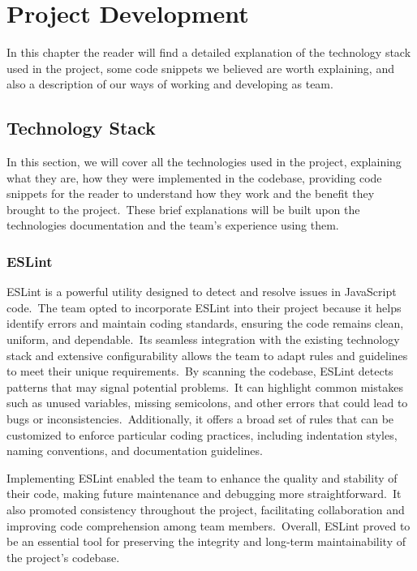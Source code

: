 \chapter{Project Development}\label{ch:project-development}

In this chapter the reader will find a detailed explanation of the technology stack used in the project, some code snippets we believed are worth explaining, and also a description of our ways of working and developing as team.

\section{Technology Stack}\label{sec:tecnology-stack}

In this section, we will cover all the technologies used in the project, explaining what they are, how they were implemented in the codebase, providing code snippets for the reader to understand how they work and the benefit they brought to the project.\ These brief explanations will be built upon the technologies documentation and the team's experience using them.

\subsection{ESLint}\label{subsec:eslint}

ESLint is a powerful utility designed to detect and resolve issues in JavaScript code.\ The team opted to incorporate ESLint into their project because it helps identify errors and maintain coding standards, ensuring the code remains clean, uniform, and dependable.\ Its seamless integration with the existing technology stack and extensive configurability allows the team to adapt rules and guidelines to meet their unique requirements.\ By scanning the codebase, ESLint detects patterns that may signal potential problems.\ It can highlight common mistakes such as unused variables, missing semicolons, and other errors that could lead to bugs or inconsistencies.\ Additionally, it offers a broad set of rules that can be customized to enforce particular coding practices, including indentation styles, naming conventions, and documentation guidelines.\cite[ESLint]{eslint}

Implementing ESLint enabled the team to enhance the quality and stability of their code, making future maintenance and debugging more straightforward.\ It also promoted consistency throughout the project, facilitating collaboration and improving code comprehension among team members.\ Overall, ESLint proved to be an essential tool for preserving the integrity and long-term maintainability of the project's codebase.

